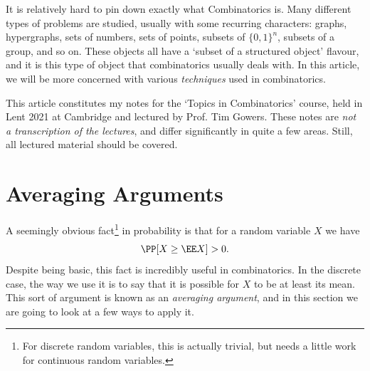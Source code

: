 



It is relatively hard to pin down exactly what Combinatorics is. Many different types of problems are studied, usually with some recurring characters: graphs, hypergraphs, sets of numbers, sets of points, subsets of $\{0, 1\}^n$, subsets of a group, and so on. These objects all have a `subset of a structured object' flavour, and it is this type of object that combinatorics usually deals with. In this article, we will be more concerned with various \emph{techniques} used in combinatorics.

This article constitutes my notes for the `Topics in Combinatorics' course, held in Lent 2021 at Cambridge and lectured by Prof. Tim Gowers. These notes are \emph{not a transcription of the lectures}, and differ significantly in quite a few areas. Still, all lectured material should be covered.








\section{Averaging Arguments}

A seemingly obvious fact\footnote{For discrete random variables, this is actually trivial, but needs a little work for continuous random variables.} in probability is that for a random variable $X$ we have
$$
\PP[X \geq \EE X] > 0.
$$
Despite being basic, this fact is incredibly useful in combinatorics. In the discrete case, the way we use it is to say that it is possible for $X$ to be at least its mean. This sort of argument is known as an \emph{averaging argument}, and in this section we are going to look at a few ways to apply it.



